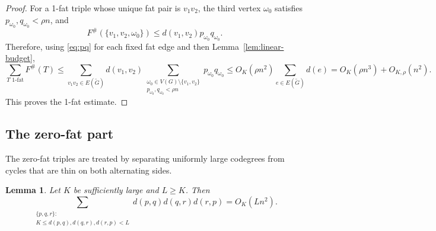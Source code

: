 \documentclass[11pt,letterpaper]{article}
\newtheorem{lemma}[theorem]{Lemma}
\begin{document}
\begin{proof}
For a 1-fat triple whose unique fat pair is \(v_1v_2\), the third vertex \(\omega_0\) satisfies
\(p_{\omega_0},q_{\omega_0}<\rho n\), and
\[
  F^{\#}(\{v_1,v_2,\omega_0\})\le d(v_1,v_2)p_{\omega_0}q_{\omega_0}.
\]
Therefore, using \eqref{eq:pq} for each fixed fat edge and then Lemma~\ref{lem:linear-budget},
\[
  \sum_{T\text{ 1-fat}}F^{\#}(T)
  \le
  \sum_{v_1v_2\in E(\tilde{G})}d(v_1,v_2)
  \sum_{\substack{\omega_0\in V(G)\setminus\{v_1,v_2\}\\p_{\omega_0},q_{\omega_0}<\rho n}}
  p_{\omega_0}q_{\omega_0}
  \le O_K(\rho n^2)\sum_{e\in E(\tilde{G})}d(e)
  =O_K(\rho n^3)+O_{K,\rho}(n^2).
\]
This proves the 1-fat estimate.
\end{proof}

\subsection{The zero-fat part}

The zero-fat triples are treated by separating uniformly large codegrees from cycles that are thin on
both alternating sides.

\begin{lemma}\label{lem:all-large}
Let \(K\) be sufficiently large and \(L\ge K\). Then
\[
  \sum_{\substack{\{p,q,r\}:\\K\le d(p,q),d(q,r),d(r,p)<L}}
  d(p,q)d(q,r)d(r,p)=O_K(Ln^2).
\]
\end{lemma}
\end{document}
